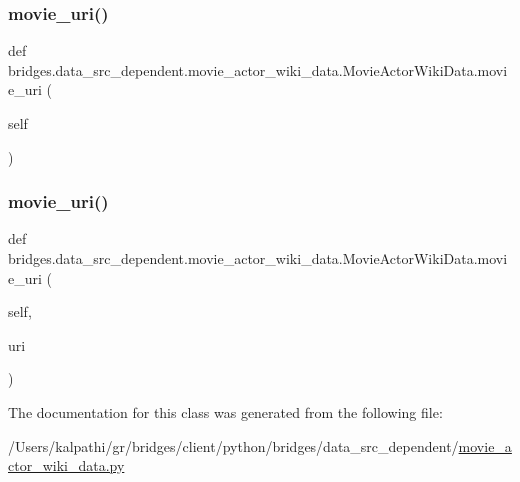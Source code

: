 \subsubsection{\texorpdfstring{movie\+\_\+uri()}{movie\_uri()}\hspace{0.1cm}{\footnotesize\ttfamily [1/2]}}
{\footnotesize\ttfamily def bridges.\+data\+\_\+src\+\_\+dependent.\+movie\+\_\+actor\+\_\+wiki\+\_\+data.\+Movie\+Actor\+Wiki\+Data.\+movie\+\_\+uri (\begin{DoxyParamCaption}\item[{}]{self }\end{DoxyParamCaption})}

\mbox{\label{classbridges_1_1data__src__dependent_1_1movie__actor__wiki__data_1_1_movie_actor_wiki_data_ae9e09370897da0ed4daa3a9378907b50}} 
\subsubsection{\texorpdfstring{movie\+\_\+uri()}{movie\_uri()}\hspace{0.1cm}{\footnotesize\ttfamily [2/2]}}
{\footnotesize\ttfamily def bridges.\+data\+\_\+src\+\_\+dependent.\+movie\+\_\+actor\+\_\+wiki\+\_\+data.\+Movie\+Actor\+Wiki\+Data.\+movie\+\_\+uri (\begin{DoxyParamCaption}\item[{}]{self,  }\item[{}]{uri }\end{DoxyParamCaption})}



The documentation for this class was generated from the following file\+:\begin{DoxyCompactItemize}
\item 
/\+Users/kalpathi/gr/bridges/client/python/bridges/data\+\_\+src\+\_\+dependent/\mbox{\hyperlink{movie__actor__wiki__data_8py}{movie\+\_\+actor\+\_\+wiki\+\_\+data.\+py}}\end{DoxyCompactItemize}
